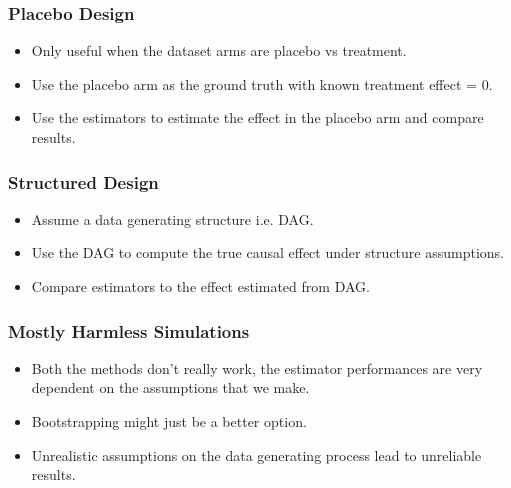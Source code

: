 \documentclass{beamer}
\begin{document}
\begin{frame}
	\frametitle{Placebo Design}
	\begin{itemize}
		\item Only useful when the dataset arms are placebo vs treatment.
		\item Use the placebo arm as the ground truth with known treatment effect = $ 0 $.
		\item Use the estimators to estimate the effect in the placebo arm and compare results.
	\end{itemize}
\end{frame}

\begin{frame}
	\frametitle{Structured Design}
	\begin{itemize}
		\item Assume a data generating structure i.e. DAG.
		\item Use the DAG to compute the true causal effect under structure assumptions.
		\item Compare estimators to the effect estimated from DAG.
	\end{itemize}
\end{frame}

\begin{frame}
	\frametitle{Mostly Harmless Simulations}
	\begin{itemize}
		\item Both the methods don't really work, the estimator performances are very
			dependent on the assumptions that we make.
		\item Bootstrapping might just be a better option.
		\item Unrealistic assumptions on the data generating process lead to unreliable results.
	\end{itemize}
\end{frame}
\end{document}
